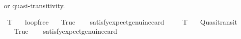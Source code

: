 \begin{isabellebody}
\begin{isamarkuptext}
 or quasi-transitivity.%
\end{isamarkuptext}\isamarkuptrue%
\isamarkupfalse%
\ T{}{\isacharcolon}{\kern0pt}\isanewline
\ \ \ loopfree\isanewline
\ \ \ True\isanewline
\ \ \isamarkupfalse%
\ {\isacharbrackleft}{\kern0pt}satisfy{\isacharcomma}{\kern0pt}expect{\isacharequal}{\kern0pt}genuine{\isacharcomma}{\kern0pt}card{\isacharequal}{\kern0pt}{}{\isacharbrackright}{\kern0pt}\ %
\isanewline
%
\isadelimproof
\ \ %
\endisadelimproof
%
\isatagproof
{}\isamarkupfalse%
%
\endisatagproof
{\isafoldproof}%
%
\isadelimproof
\isanewline
%
\endisadelimproof
\isanewline
{}\isamarkupfalse%
\ T{}{\isacharcolon}{\kern0pt}\isanewline
\ \ \ Quasitransit\isanewline
\ \ \ True\isanewline
\ \ \isamarkupfalse%
\ {\isacharbrackleft}{\kern0pt}satisfy{\isacharcomma}{\kern0pt}expect{\isacharequal}{\kern0pt}genuine{\isacharcomma}{\kern0pt}card{\isacharequal}{\kern0pt}{}{\isacharbrackright}{\kern0pt}\ %
\isanewline
%
\isadelimproof
\ \ %
\endisadelimproof
%
\isatagproof
{}\isamarkupfalse%
%
\endisatagproof
{\isafoldproof}%
%
\isadelimproof
\isanewline
%
\endisadelimproof
%
\isadelimtheory
\isanewline
%
\endisadelimtheory
%
\isatagtheory
{}\isamarkupfalse%
%
\endisatagtheory
{\isafoldtheory}%
%
\isadelimtheory
%
\endisadelimtheory
%
\end{isabellebody}%
\endinput
